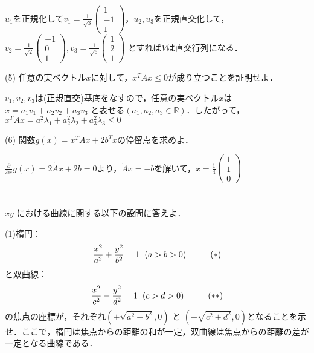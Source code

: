\documentclass[a4j]{jarticle}
\let \ds \displaystyle
\newcommand{\pdiff}[3]{
  \frac{\partial^{#1} #2}{\partial #3^{#1}}
}
\begin{document}
$u_1$を正規化して$\ds v_1 = \frac{1}{\sqrt{3}}\begin{pmatrix}1 \\ -1 \\ 1\end{pmatrix}$，$u_2,u_3$を正規直交化して，$\ds v_2=\frac{1}{\sqrt{2}}\begin{pmatrix} -1 \\ 0 \\ 1\end{pmatrix},v_3=\frac{1}{\sqrt{6}}\begin{pmatrix} 1 \\ 2 \\ 1\end{pmatrix}$ とすれば$V$は直交行列になる．

\begin{screen}
 (5) 任意の実ベクトル$x$に対して，$x^TAx \leq 0$が成り立つことを証明せよ．
\end{screen}

$v_1,v_2,v_3$は(正規直交)基底をなすので，任意の実ベクトル$x$は$x=a_1v_1+a_2v_2+a_3v_3$ と表せる$(a_1,a_2,a_3\in \mathbb{R})$．したがって，$x^TAx = a_1^2\lambda_1+a_2^2\lambda_2+a_3^2\lambda_3 \leq 0$

\begin{screen}
 (6) 関数$g(x)=x^TAx + 2b^Tx$の停留点を求めよ．
\end{screen}

$\ds \pdiff{}{}{x}g(x) = 2\tilde{A}x + 2b = 0$より，$\tilde{A}x=-b$を解いて，$\ds  x=\frac{1}{4}\begin{pmatrix} 1\\ 1 \\0 \end{pmatrix}$

\section{}

\begin{screen}
 $xy$ における曲線に関する以下の設問に答えよ．
\end{screen}
\begin{screen}
 (1)楕円：
 \begin{align*}
  \frac{x^2}{a^2}+\frac{y^2}{b^2}=1 \hspace{2mm} (a>b>0) \hspace{10mm} (\ast)
 \end{align*}
 と双曲線：
 \begin{align*}
  \frac{x^2}{c^2}-\frac{y^2}{d^2}=1 \hspace{2mm} (c>d>0) \hspace{10mm} (\ast\ast)
 \end{align*}
 の焦点の座標が，それぞれ$\ds \left(\pm\sqrt{a^2-b^2},0\right)$ と $\ds\left(\pm\sqrt{c^2+d^2},0\right)$となることを示せ．ここで，楕円は焦点からの距離の和が一定，双曲線は焦点からの距離の差が一定となる曲線である．
\end{screen}
\end{document}
